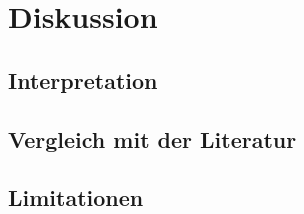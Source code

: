 \chapter{Diskussion}\label{chap:diskussion}

\section{Interpretation}\label{sec:interpretation}

\section{Vergleich mit der Literatur}\label{sec:literaturvergleich}

\section{Limitationen}\label{sec:limitationen}
